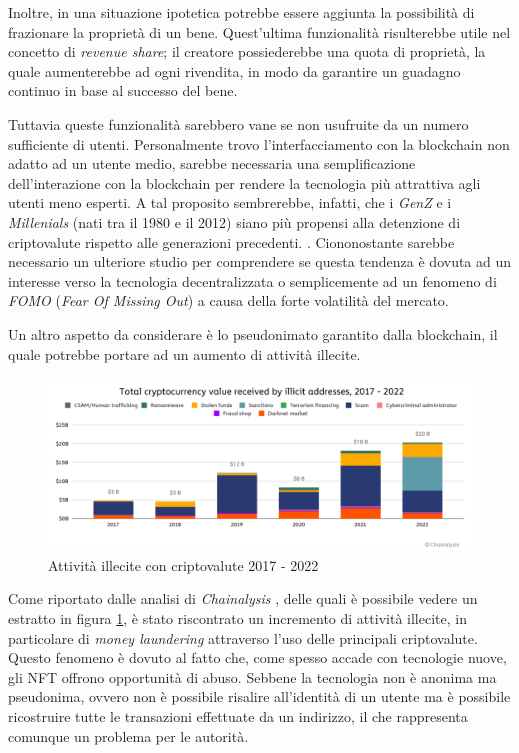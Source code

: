 Inoltre, in una situazione ipotetica potrebbe essere aggiunta la possibilità di frazionare la proprietà di un bene. Quest'ultima funzionalità risulterebbe utile nel concetto di \textit{revenue share}; il creatore possiederebbe una quota di proprietà, la quale aumenterebbe ad ogni rivendita, in modo da garantire un guadagno continuo in base al successo del bene. 

Tuttavia queste funzionalità sarebbero vane se non usufruite da un numero sufficiente di utenti. Personalmente trovo l'interfacciamento con la blockchain non adatto ad un utente medio, sarebbe necessaria una semplificazione dell'interazione con la blockchain per rendere la tecnologia più attrattiva agli utenti meno esperti. A tal proposito
sembrerebbe, infatti, che i \textit{GenZ} e i \textit{Millenials} (nati tra il 1980 e il 2012) siano più propensi alla detenzione di criptovalute rispetto alle generazioni precedenti. \cite{belk2022money}. Ciononostante sarebbe necessario un ulteriore studio per comprendere se questa tendenza è dovuta ad un interesse verso la tecnologia decentralizzata o semplicemente ad un fenomeno di \textit{FOMO} (\textit{Fear Of Missing Out}) a causa della forte volatilità del mercato. \cite{genz-fomo} 

Un altro aspetto da considerare è lo pseudonimato garantito dalla blockchain, il quale potrebbe portare ad un aumento di attività illecite.

\begin{figure}[H]
    \centering
    \includegraphics[width=\textwidth]{images/result_illecit.png}
    \caption{Attività illecite con criptovalute 2017 - 2022}  
    \label{fig:risultati_illecito}
\end{figure}

Come riportato dalle analisi di \textit{Chainalysis} \cite{chainalysis-money-laundering}, delle quali è possibile vedere un estratto in figura \ref{fig:risultati_illecito}, è stato riscontrato un incremento di attività illecite, in particolare di \textit{money laundering} attraverso l'uso delle principali criptovalute. Questo fenomeno è dovuto al fatto che, come spesso accade con tecnologie nuove, gli NFT offrono opportunità di abuso. Sebbene la tecnologia non è anonima ma pseudonima, ovvero non è possibile risalire all'identità di un utente ma è possibile ricostruire tutte le transazioni effettuate da un indirizzo, il che rappresenta comunque un problema per le autorità. \cite{bitstamp-privacy}


